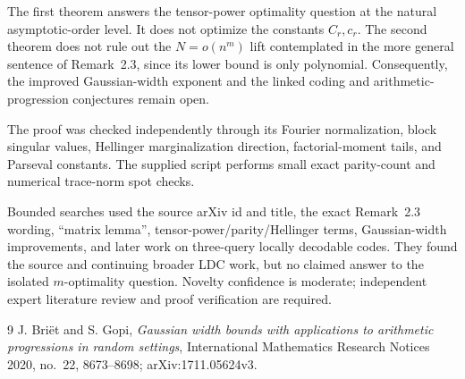 \documentclass[11pt]{article}
\begin{document}
The first theorem answers the tensor-power optimality question at the natural
asymptotic-order level.  It does not optimize the constants $C_r,c_r$.  The
second theorem does not rule out the $N=o(n^m)$ lift contemplated in the more
general sentence of Remark~2.3, since its lower bound is only polynomial.
Consequently, the improved Gaussian-width exponent and the linked coding and
arithmetic-progression conjectures remain open.

The proof was checked independently through its Fourier normalization, block
singular values, Hellinger marginalization direction, factorial-moment tails,
and Parseval constants.  The supplied script performs small exact parity-count
and numerical trace-norm spot checks.

Bounded searches used the source arXiv id and title, the exact Remark~2.3
wording, ``matrix lemma'', tensor-power/parity/Hellinger terms, Gaussian-width
improvements, and later work on three-query locally decodable codes.  They
found the source and continuing broader LDC work, but no claimed answer to the
isolated $m$-optimality question.  Novelty confidence is moderate; independent
expert literature review and proof verification are required.

\begin{thebibliography}{9}
J. Bri\"et and S. Gopi,
\emph{Gaussian width bounds with applications to arithmetic progressions in
random settings}, International Mathematics Research Notices 2020, no.~22,
8673--8698; arXiv:1711.05624v3.
\end{thebibliography}
\end{document}
